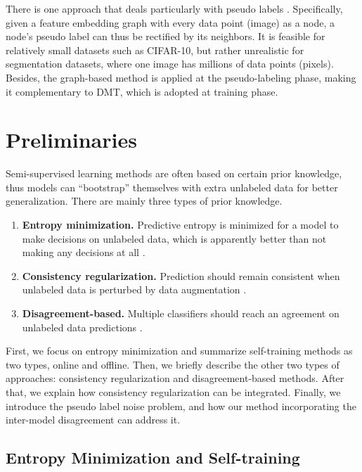 \documentclass[preprint,review,10pt]{elsarticle}
\begin{document}
There is one approach that deals particularly with pseudo labels \cite{li2020density}. Specifically, given a feature embedding graph with every data point (image) as a node, a node's pseudo label can thus be rectified by its neighbors. It is feasible for relatively small datasets such as CIFAR-10, but rather unrealistic for segmentation datasets, where one image has millions of data points (pixels). Besides, the graph-based method is applied at the pseudo-labeling phase, making it complementary to DMT, which is adopted at training phase.

\section{Preliminaries}
\label{sec:2}

Semi-supervised learning methods are often based on certain prior knowledge, thus models can ``bootstrap'' themselves with extra unlabeled data for better generalization. There are mainly three types of prior knowledge.

\begin{enumerate}
    \item \textbf{Entropy minimization.} Predictive entropy is minimized for a model to make decisions on unlabeled data, which is apparently better than not making any decisions at all \cite{grandvalet2005semi}.
    \item \textbf{Consistency regularization.} Prediction should remain consistent when unlabeled data is perturbed by data augmentation \cite{tarvainen2017mean}.
    \item \textbf{Disagreement-based.} Multiple classifiers should reach an agreement on unlabeled data predictions \cite{qiao2018deep}.
\end{enumerate}

First, we focus on entropy minimization \cite{grandvalet2005semi} and summarize self-training methods as two types, online and offline. Then, we briefly describe the other two types of approaches: consistency regularization and disagreement-based methods. After that, we explain how consistency regularization can be integrated. Finally, we introduce the pseudo label noise problem, and how our method incorporating the inter-model disagreement can address it.

\subsection{Entropy Minimization and Self-training}
\label{sec:21}
\end{document}
